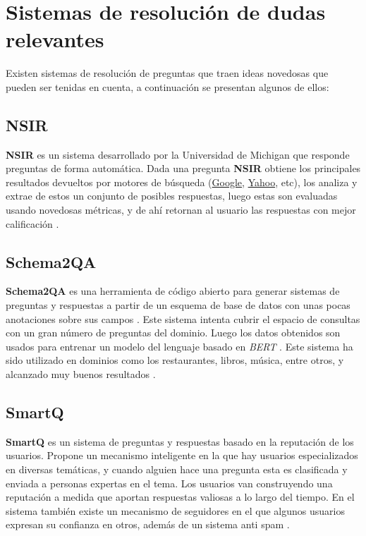 \section{Sistemas de resolución de dudas relevantes}

Existen sistemas de resolución de preguntas que traen ideas novedosas que pueden ser tenidas en cuenta, a continuación se presentan algunos de ellos:

\subsection{NSIR}

\textbf{NSIR} es un sistema desarrollado por la Universidad de Michigan que responde preguntas de forma automática. Dada una pregunta \textbf{NSIR} obtiene los principales resultados devueltos por motores de búsqueda (\href{google.com}{Google}, \href{yahoo.com}{Yahoo}, etc), los analiza y extrae de estos un conjunto de posibles respuestas, luego estas son evaluadas usando novedosas métricas, y de ahí retornan al usuario las respuestas con mejor calificación \cite{nsir}.


\subsection{Schema2QA}

\textbf{Schema2QA} es una herramienta de código abierto para generar sistemas de preguntas y respuestas a partir de un esquema de base de datos con unas pocas anotaciones sobre sus campos \cite{s2qa}. Este sistema intenta cubrir el espacio de consultas con un gran número de preguntas del dominio. Luego los datos obtenidos son usados para entrenar un modelo del lenguaje basado en \textit{BERT} \cite{bert}. Este sistema ha sido utilizado en dominios como los restaurantes, libros, música, entre otros, y alcanzado muy buenos resultados \cite{s2qa}.


\subsection{SmartQ}

\textbf{SmartQ} es un sistema de preguntas y respuestas basado en la reputación de los usuarios. Propone un mecanismo inteligente en la que hay usuarios especializados en diversas temáticas, y cuando alguien hace una pregunta esta es clasificada y enviada a personas expertas en el tema. Los usuarios van construyendo una reputación a medida que aportan respuestas valiosas a lo largo del tiempo. En el sistema también existe un mecanismo de seguidores en el que algunos usuarios expresan su confianza en otros, además de un sistema anti spam \cite{smartq}.

